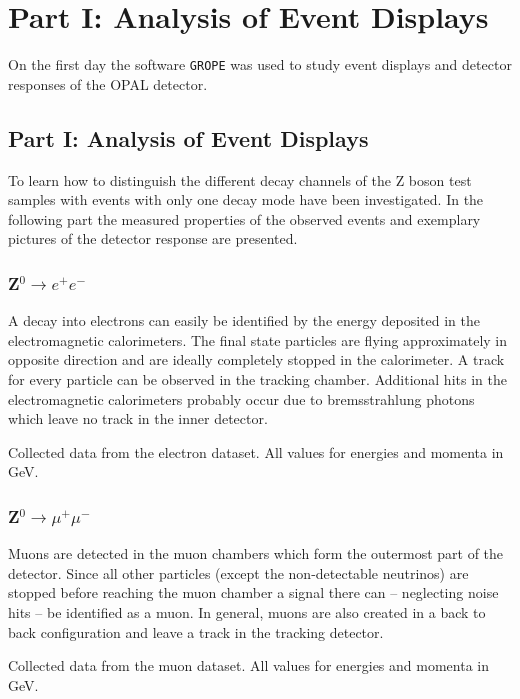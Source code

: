 \documentclass[11pt, a4paper]{article}
\numberwithin{equation}{section}
\begin{document}
\section{Part I: Analysis of Event Displays}

On the first day the software \texttt{GROPE} was used to study event displays and detector responses of the OPAL detector.

\subsection{Part I: Analysis of Event Displays}

To learn how to distinguish the different decay channels of the Z boson test samples with events with only one decay mode have been investigated.
In the following part the measured properties of the observed events and exemplary pictures of the detector response are presented.

\subsubsection{Z$^0\rightarrow e^+e^-$}

A decay into electrons can easily be identified by the energy deposited in the electromagnetic calorimeters.
The final state particles are flying approximately in opposite direction and are ideally completely stopped in the calorimeter.
A track for every particle can be observed in the tracking chamber.
Additional hits in the electromagnetic calorimeters probably occur due to bremsstrahlung photons which leave no track in the inner detector.
\begin{table}
	\centering
	
	\caption{Collected data from the electron dataset. All values for energies and momenta in \si{GeV}.}
\end{table}

\subsubsection{Z$^0\rightarrow \mu^+\mu^-$}

Muons are detected in the muon chambers which form the outermost part of the detector.
Since all other particles (except the non-detectable neutrinos) are stopped before reaching the muon chamber a signal there can -- neglecting noise hits -- be identified as a muon. 
In general, muons are also created in a back to back configuration and leave a track in the tracking detector.
\begin{table}
	\centering

	
	\caption{Collected data from the muon dataset. All values for energies and momenta in \si{GeV}.}
\end{table}
\end{document}
